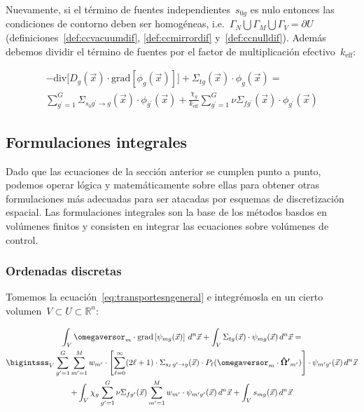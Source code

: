 Nuevamente, si el término de fuentes independientes~$s_{0g}$ es nulo entonces las condiciones de contorno deben ser homogéneas, i.e.~$\Gamma_N \bigcup \Gamma_M \bigcup \Gamma_V = \partial U$ (definiciones~\ref{def:ccvacuumdif}, \ref{def:ccmirrordif} y~\ref{def:ccnulldif}). Además debemos dividir el término de fuentes por el factor de multiplicación efectivo~$k_\text{eff}$:

\begin{multline}\label{eq:difusionmultigrupokeff}
 - \text{div} \Big[ D_g(\vec{x}) \cdot \text{grad} \left[ \phi_g(\vec{x}) \right] \Big]
 + \Sigma_{t g}(\vec{x}) \cdot \phi_g(\vec{x})
 = \\
\sum_{g^\prime = 1}^G \Sigma_{s_0 g^\prime \rightarrow g}(\vec{x})  \cdot \phi_{g^\prime}(\vec{x}) +
\frac{\chi_g}{k_\text{eff}} \sum_{g^\prime = 1}^G \nu\Sigma_{fg^\prime}(\vec{x}) \cdot \phi_{g^\prime}(\vec{x})
\end{multline}

\subsection{Formulaciones integrales} %
\label{sec:integrales}

Dado que las ecuaciones de la sección anterior se cumplen punto a punto, podemos operar lógica y matemáticamente sobre ellas para obtener otras formulaciones más adecuadas para ser atacadas por esquemas de discretización espacial. Las formulaciones integrales son la base de los métodos basdos en volúmenes finitos y consisten en integrar las ecuaciones sobre volúmenes de control. 

\subsubsection{Ordenadas discretas} %

Tomemos la ecuación~\eqref{eq:transportesngeneral} e integrémosla en un cierto volumen~$V \subset U \subset \mathbb{R}^n$:

\begin{multline*}
 \int_V \omegaversor_m \cdot \text{grad} \left[ \psi_{mg}(\vec{x}) \right] \, d^n\vec{x}
 +
 \int_V \Sigma_{t g}(\vec{x}) \cdot \psi_{mg}(\vec{x}) \, d^n\vec{x} = \\
 \bigintsss_V \sum_{g^\prime=1}^G \sum_{m^\prime=1}^M w_{m^\prime} \cdot
\left[  \sum_{\ell=0}^\infty (2\ell+1) \cdot \Sigma_{s_\ell \,g^\prime \rightarrow g}(\vec{x}) \cdot P_\ell (\omegaversor_m \cdot \boldsymbol{\hat{\Omega}^\prime}_{m^\prime}) \right]
 \cdot \psi_{m^\prime g^\prime}(\vec{x}) \, d^n\vec{x} \\
+
 \int_V \chi_g \sum_{g^\prime=1}^G \nu\Sigma_{fg^\prime}(\vec{x}) \sum_{m^\prime=1}^M w_{m^\prime} \cdot \psi_{m^\prime g^\prime}(\vec{x}) \, d^n\vec{x}
+
 \int_V s_{mg}(\vec{x}) \, d^n\vec{x}
\end{multline*}

